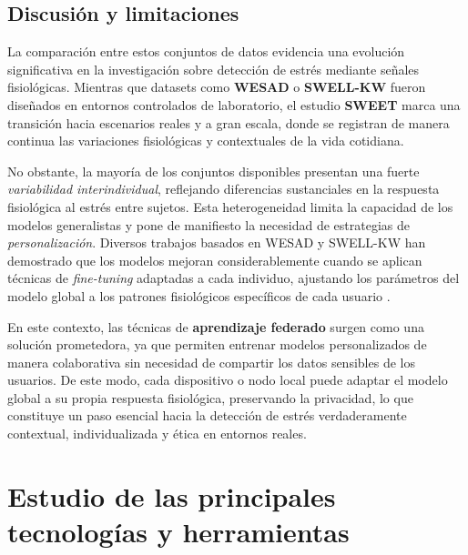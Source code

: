 \documentclass{report}
\begin{document}
\subsection{Discusión y limitaciones}

La comparación entre estos conjuntos de datos evidencia una evolución significativa en la investigación sobre detección de estrés mediante señales fisiológicas.  
Mientras que datasets como \textbf{WESAD} o \textbf{SWELL-KW} fueron diseñados en entornos controlados de laboratorio, el estudio \textbf{SWEET} marca una transición hacia escenarios reales y a gran escala, donde se registran de manera continua las variaciones fisiológicas y contextuales de la vida cotidiana.  

No obstante, la mayoría de los conjuntos disponibles presentan una fuerte \textit{variabilidad interindividual}, reflejando diferencias sustanciales en la respuesta fisiológica al estrés entre sujetos. Esta heterogeneidad limita la capacidad de los modelos generalistas y pone de manifiesto la necesidad de estrategias de \textit{personalización}.  
Diversos trabajos basados en WESAD y SWELL-KW han demostrado que los modelos mejoran considerablemente cuando se aplican técnicas de \textit{fine-tuning} adaptadas a cada individuo, ajustando los parámetros del modelo global a los patrones fisiológicos específicos de cada usuario \cite{abd2024wearable,dahal2023global}.  

En este contexto, las técnicas de \textbf{aprendizaje federado} surgen como una solución prometedora, ya que permiten entrenar modelos personalizados de manera colaborativa sin necesidad de compartir los datos sensibles de los usuarios.  
De este modo, cada dispositivo o nodo local puede adaptar el modelo global a su propia respuesta fisiológica, preservando la privacidad, lo que constituye un paso esencial hacia la detección de estrés verdaderamente contextual, individualizada y ética en entornos reales.





\section{Estudio de las principales tecnologías y herramientas}
\end{document}
